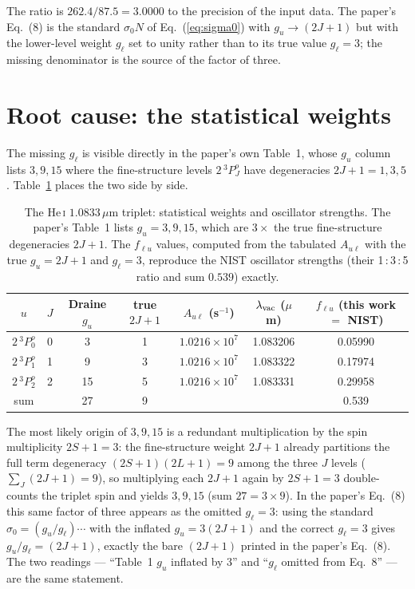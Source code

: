 \documentclass[english,a4paper]{my_memo}
\newcommand{\HeI}{He\,\textsc{i}}
\newcommand{\tPPP}{2\,^3\!P^o_J}
\newcommand{\gu}{g_u}
\newcommand{\gl}{g_\ell}
\begin{document}
The ratio is $262.4/87.5 = 3.0000$ to the precision of the input data.
The paper's Eq.~(8) is the standard $\sigma_0 N$ of
Eq.~(\ref{eq:sigma0}) with $\gu \to (2J+1)$ but with the lower-level
weight $\gl$ set to unity rather than to its true value $\gl = 3$; the
missing denominator is the source of the factor of three.

\section{Root cause: the statistical weights}
The missing $\gl$ is visible directly in the paper's own Table~1, whose
$g_u$ column lists $3, 9, 15$ where the fine-structure levels $\tPPP$ have
degeneracies $2J+1 = 1, 3, 5$.  Table~\ref{tab:weights} places the two
side by side.

\begin{table}[h]
\centering
\caption{The \HeI{} $1.0833\,\mu$m triplet: statistical weights and
oscillator strengths.  The paper's Table~1 lists $g_u = 3, 9, 15$, which
are $3\times$ the true fine-structure degeneracies $2J+1$.  The $f_{\ell u}$
values, computed from the tabulated $A_{u\ell}$ with the true
$\gu = 2J+1$ and $\gl = 3$, reproduce the NIST oscillator strengths (their
1\,:\,3\,:\,5 ratio and sum $0.539$) exactly.}
\label{tab:weights}
\begin{tabular}{ccccccc}
\toprule
$u$ & $J$ & Draine $g_u$ & true $2J+1$
    & $A_{u\ell}$ (s$^{-1}$) & $\lambda_{\rm vac}$ ($\mu$m)
    & $f_{\ell u}$ (this work $=$ NIST) \\
\midrule
$2\,^3\!P^o_0$ & 0 & \phantom{0}3 & 1 & $1.0216\times10^7$ & 1.083206 & 0.05990 \\
$2\,^3\!P^o_1$ & 1 & \phantom{0}9 & 3 & $1.0216\times10^7$ & 1.083322 & 0.17974 \\
$2\,^3\!P^o_2$ & 2 & 15          & 5 & $1.0216\times10^7$ & 1.083331 & 0.29958 \\
\midrule
sum & & 27 & 9 & & & 0.539 \\
\bottomrule
\end{tabular}
\end{table}

The most likely origin of $3, 9, 15$ is a redundant multiplication by the
spin multiplicity $2S+1 = 3$: the fine-structure weight $2J+1$ already
partitions the full term degeneracy $(2S+1)(2L+1) = 9$ among the three
$J$ levels ($\sum_J (2J+1) = 9$), so multiplying each $2J+1$ again by
$2S+1 = 3$ double-counts the triplet spin and yields
$3, 9, 15$ (sum $27 = 3\times9$).  In the paper's Eq.~(8) this
same factor of three appears as the omitted $\gl = 3$: using the standard
$\sigma_0 = (\gu/\gl)\cdots$ with the inflated $\gu = 3(2J+1)$ and the
correct $\gl = 3$ gives $\gu/\gl = (2J+1)$, exactly the bare $(2J+1)$
printed in the paper's Eq.~(8).  The two readings --- ``Table~1 $g_u$
inflated by 3'' and ``$\gl$ omitted from Eq.~8'' --- are the same
statement.
\end{document}
